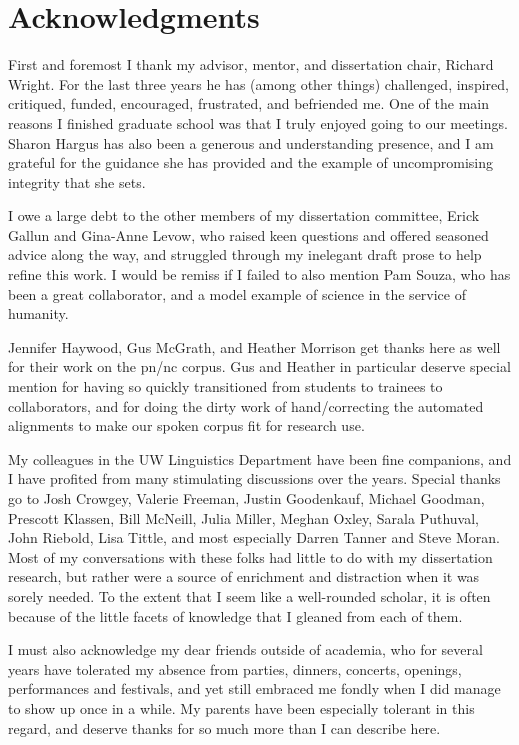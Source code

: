 \chapter*{Acknowledgments}
First and foremost I thank my advisor, mentor, and dissertation chair, Richard Wright.  For the last three years he has (among other things) challenged, inspired, critiqued, funded, encouraged, frustrated, and befriended me.  One of the main reasons I finished graduate school was that I truly enjoyed going to our meetings.  Sharon Hargus has also been a generous and understanding presence, and I am grateful for the guidance she has provided and the example of uncompromising integrity that she sets.

I owe a large debt to the other members of my dissertation committee, Erick Gallun and Gina-Anne Levow, who raised keen questions and offered seasoned advice along the way, and struggled through my inelegant draft prose to help refine this work.  I would be remiss if I failed to also mention Pam Souza, who has been a great collaborator, and a model example of science in the service of humanity.  

Jennifer Haywood, Gus McGrath, and Heather Morrison get thanks here as well for their work on the \ac{pn/nc} corpus.  Gus and Heather in particular deserve special mention for having so quickly transitioned from students to trainees to collaborators, and for doing the dirty work of hand\-/correcting the automated alignments to make our spoken corpus fit for research use.

My colleagues in the UW Linguistics Department have been fine companions, and I have profited from many stimulating discussions over the years.  Special thanks go to Josh Crowgey, Valerie Freeman, Justin Goodenkauf, Michael Goodman, Prescott Klassen, Bill McNeill, Julia Miller, Meghan Oxley, Sarala Puthuval, John Riebold, Lisa Tittle, and most especially Darren Tanner and Steve Moran.  Most of my conversations with these folks had little to do with my dissertation research, but rather were a source of enrichment and distraction when it was sorely needed.  To the extent that I seem like a well-rounded scholar, it is often because of the little facets of knowledge that I gleaned from each of them.  

I must also acknowledge my dear friends outside of academia, who for several years have tolerated my absence from parties, dinners, concerts, openings, performances and festivals, and yet still embraced me fondly when I did manage to show up once in a while.  My parents have been especially tolerant in this regard, and deserve thanks for so much more than I can describe here.

